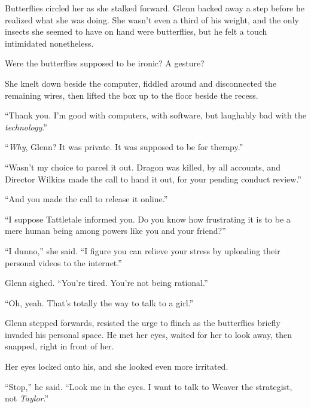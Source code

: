 Butterflies circled her as she stalked forward.  Glenn backed away a step before he realized what she was doing.  She wasn't even a third of his weight, and the only insects she seemed to have on hand were butterflies, but he felt a touch intimidated nonetheless.



Were the butterflies supposed to be ironic?  A gesture?



She knelt down beside the computer, fiddled around and disconnected the remaining wires, then lifted the box up to the floor beside the recess.



``Thank you.  I'm good with computers, with software, but laughably bad with the \emph{technology}.''



``\emph{Why}, Glenn?  It was private.  It was supposed to be for therapy.''



``Wasn't my choice to parcel it out.  Dragon was killed, by all accounts, and Director Wilkins made the call to hand it out, for your pending conduct review.''



``And you made the call to release it online.''



``I suppose Tattletale informed you.  Do you know how frustrating it is to be a mere human being among powers like you and your friend?''



``I dunno,'' she said.  ``I figure you can relieve your stress by uploading their personal videos to the internet.''



Glenn sighed.  ``You're tired.  You're not being rational.''



``Oh, yeah.  That's totally the way to talk to a girl.''



Glenn stepped forwards, resisted the urge to flinch as the butterflies briefly invaded his personal space.  He met her eyes, waited for her to look away, then snapped, right in front of her.



Her eyes locked onto his, and she looked even more irritated.



``Stop,'' he said.  ``Look me in the eyes.  I want to talk to Weaver the strategist, not \emph{Taylor}.''



